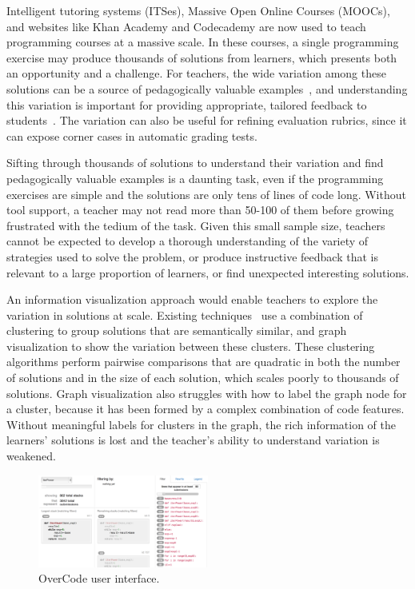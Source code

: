 \documentclass{sigchi}
\begin{document}
Intelligent tutoring systems (ITSes), Massive Open Online Courses (MOOCs), and websites like Khan Academy and Codecademy are now used to teach programming courses at a massive scale. In these courses, a single programming exercise may produce thousands of solutions from learners, which presents both an opportunity and a challenge. For teachers, the wide variation among these solutions can be a source of pedagogically valuable examples~\cite{marton13}, and understanding this variation is important for providing appropriate, tailored feedback to students~\cite{basupowergrading,MOOCshop}. The variation can also be useful for refining evaluation rubrics, since it can expose corner cases in automatic grading tests.

Sifting through thousands of solutions to understand their variation and find pedagogically valuable examples is a daunting task, even if the programming exercises are simple and the solutions are only tens of lines of code long. Without tool support, a teacher may not read more than 50-100 of them before growing frustrated with the tedium of the task. Given this small sample size, teachers cannot be expected to develop a thorough understanding of the variety of strategies used to solve the problem, or produce instructive feedback that is relevant to a large proportion of learners, or find unexpected interesting solutions.

An information visualization approach would enable teachers to explore the variation in solutions at scale. Existing techniques~\cite{gradingsigcse14,MOOCshop,codewebs} use a combination of clustering to group solutions that are semantically similar, and graph visualization to show the variation between these clusters. These clustering algorithms perform pairwise comparisons that are quadratic in both the number of solutions and in the size of each solution, which scales poorly to thousands of solutions. Graph visualization also struggles with how to label the graph node for a cluster, because it has been formed by a complex combination of code features. Without meaningful labels for clusters in the graph, the rich information of the learners' solutions is lost and the teacher's ability to understand variation is weakened.

\begin{figure}
\centering
\includegraphics[width=0.5\textwidth]{frontPageInterfacePreview.png}
\caption{OverCode user interface.}
\label{fig:figure1}
\end{figure}
\end{document}
